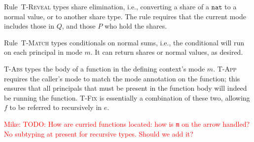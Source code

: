\documentclass[10pt]{article}
\makeatletter
\newcommand{\rulelab}[1]{{\small \textsc{#1}}}
\newcommand{\kw}[1]{\ensuremath{\mathtt{#1}}}
\newcommand{\tnat}{\ensuremath{\mathtt{nat}}}
\newcommand{\vloc}[2]{\ensuremath{{#1}\kw{@}{#2}}}
\newcommand{\vcrash}{\ensuremath{\bullet}}
\newcommand{\mwh}[1]{\textcolor{red}{Mike: #1}}
\makeatother
\begin{document}
Rule~\rulelab{T-Reveal} types share elimination, i.e., converting a
share of a $\tnat$ to a normal value, or to another share type. The
rule requires that the current mode includes those in $Q$, and those
$P$ who hold the shares.

Rule~\rulelab{T-Match} types conditionals on normal sums, i.e., the
conditional will run on each principal in mode $m$. It can return
shares or normal values, as desired. 

\rulelab{T-Abs} types the body of a function in the defining context's
mode $m$. \rulelab{T-App} requires the caller's mode to match the mode
annotation on the function; this ensures that all principals that must
be present in the function body will indeed be running the
function. \rulelab{T-Fix} is essentially a combination of these two,
allowing $f$ to be referred to recursively in $e$.


\mwh{TODO: How are curried functions located: how is \texttt{m} on the
  arrow handled? No subtyping at present for recursive types. Should
  we add it?} 
\end{document}
